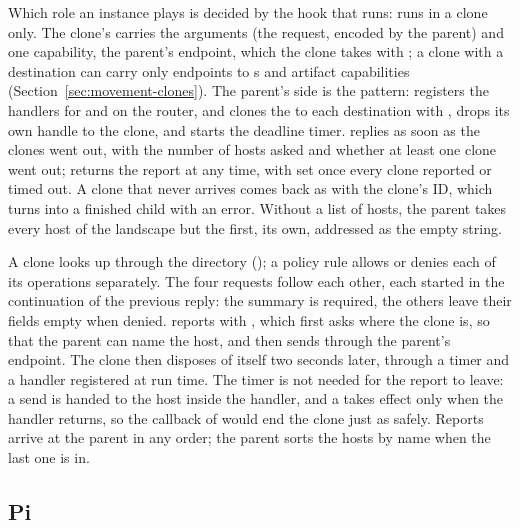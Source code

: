 Which role an instance plays is decided by the hook that runs:
 runs in a clone only. The clone's 
carries the arguments (the  request, encoded by the parent)
and one capability, the parent's endpoint, which the clone takes with
; a clone with a destination can carry only
endpoints to \paglet{}s and artifact capabilities
(Section~\ref{sec:movement-clones}). The parent's side is the
 pattern:  registers the handlers for
 and  on the router, and
 clones the \paglet{} to each destination with
, drops its own handle to
the clone, and starts the deadline timer.  replies as soon
as the clones went out, with the number of hosts asked and whether at
least one clone went out;  returns the report at any time, with  set once every clone reported
or timed out. A clone that never arrives comes back as
 with the clone's ID, which
 turns into a finished child with an error.
Without a list of hosts, the parent takes every host of the landscape but
the first, its own, addressed as the empty string.

A clone looks  up through the directory
(); a policy rule allows or denies each of its
operations separately. The four requests follow each other, each started in
the continuation of the previous reply: the summary is required, the
others leave their fields empty when denied.  reports with
, which first asks  where the clone is,
so that the parent can name the host, and then sends
 through the parent's endpoint. The clone then
disposes of itself two seconds later, through a timer and a handler
registered at run time. The timer is not needed for the report to leave:
a send is handed to the host inside the handler, and a 
takes effect only when the handler returns, so the  callback
of  would end the clone just as safely. Reports arrive
at the parent in any order; the parent sorts the hosts by name when the
last one is in.

\subsection{Pi}\label{sec:examples-pi}

